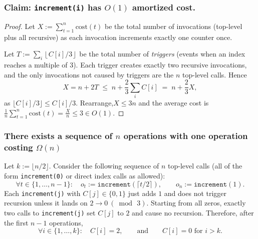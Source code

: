 \documentclass[9pt]{extarticle}
\begin{document}
\subsubsection{Claim: \texttt{increment(i)} has $O(1)$ amortized cost.}
\begin{proof}
Let $X:=\sum_{t=1}^n \mathrm{cost}(t)$ be the total number of invocations
(top-level plus all recursive) as each invocation increments exactly one counter
once.

Let $T:=\sum_i \left\lfloor C[i]/3\right\rfloor$ be the total number of
\emph{triggers} (events when an index reaches a multiple of 3). Each trigger
creates exactly two recursive invocations, and the only invocations not caused
by triggers are the $n$ top-level calls. Hence
\[
X = n + 2T \;\le\; n + \frac{2}{3}\sum_i C[i] \;=\; n + \frac{2}{3}X,
\]
as $\lfloor C[i]/3\rfloor \le C[i]/3$. Rearrange,$X\le 3n$ and the average cost is
$\frac{1}{n}\sum_{t=1}^{n}\mathrm{cost}(t)=\frac{X}{n}\le 3\in O(1)$.
\end{proof}

\subsubsection{There exists a sequence of $n$ operations with one operation costing $\Omega(n)$}
Let $k:=\lfloor n/2\rfloor$. Consider the following sequence of $n$ top-level
calls (all of the form \texttt{increment(0)} or direct index calls as allowed):
\[
\forall t\in\{1,\dots,n-1\}:\quad o_t:=\texttt{increment}\!\left(\big\lceil t/2\big\rceil\right),\qquad
o_n:=\texttt{increment}(1).
\]
Each \texttt{increment(j)} with $C[j]\in\{0,1\}$ just adds $1$ and does not
trigger recursion unless it lands on $2\to 0\ (\bmod\,3)$. Starting from all
zeros, exactly two calls to \texttt{increment(j)} set $C[j]$ to $2$ and cause
no recursion. Therefore, after the first $n-1$ operations,
\[
\forall i\in\{1,\dots,k\}:\quad C[i]=2,\qquad\text{and}\qquad C[i]=0\text{ for }i>k.
\]
\end{document}
